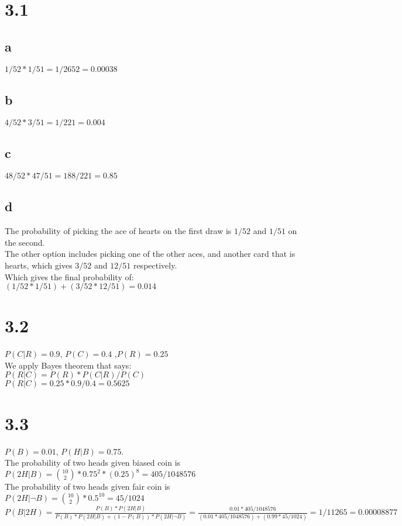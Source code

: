\documentclass{article}
\begin{document}
\section*{3.1}
\subsection*{a}
$1/52 * 1/51 = 1/2652 = 0.00038 $ \\
\subsection*{b}
$4/52 * 3/51 = 1/221 = 0.004 $ \\
\subsection*{c}
$48/52 * 47/51 = 188/221 = 0.85$ \\
\subsection*{d}
The probability of picking the ace of hearts on the first draw is $1/52$ and $1/51$ on the second. \\
The other option includes picking one of the other aces, and another card that is hearts, which gives $3/52$ and $12/51$ respectively. \\
Which gives the final probability of: \\
$(1/52*1/51)+(3/52*12/51) = 0.014$

\section*{3.2}
$P(C|R) = 0.9$, $P(C) = 0.4$ ,$P(R) = 0.25$ \\
We apply Bayes theorem that says: \\
$P(R|C) = P(R)*P(C|R) / P(C) $ \\
$P(R|C) = 0.25*0.9 / 0.4 = 0.5625$ \\

\section*{3.3}
$P(B) = 0.01$, $P(H|B) = 0.75$. \\
The probability of two heads given biased coin is $P(2H|B) = \binom{10}{2}*0.75^{2}*(0.25)^{8} = 405/1048576 $ \\
The probability of two heads given fair coin is $P(2H|\neg B) = \binom{10}{2}*0.5^{10} = 45/1024 $ \\
$P(B|2H) = \frac{P(B)*P(2H|B)}{P(B)*P(2H|B)+(1-P(B))*P(2H|\neg B)} = \frac{0.01*405/1048576}{(0.01*405/1048576)+(0.99*45/1024)} = 1/11265 = 0.00008877$ \\
\end{document}
